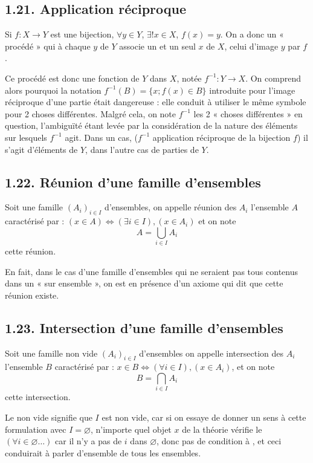 \subsection*{1.21. Application réciproque}

Si $f:X\to Y$ est une bijection, $\forall y\in Y$, $\exists!x\in X$, $f(x)=y$. On a donc un « procédé » qui à chaque $y$ de $Y$ associe un et un seul $x$ de $X$, celui d'image $y$ par $f$.

Ce procédé est donc une fonction de $Y$ dans $X$, notée $f^{-1}:Y\to X$. On comprend alors pourquoi la notation $f^{-1}(B)=\{x;f(x)\in B\}$ introduite pour l'image réciproque d'une partie était dangereuse : elle conduit à utiliser le même symbole pour 2 choses différentes. Malgré cela, on note $f^{-1}$ les 2 « choses différentes » en question, l'ambiguïté étant levée par la considération de la nature des éléments sur lesquels $f^{-1}$ agit. Dans un cas, ($f^{-1}$ application réciproque de la bijection $f$) il s'agit d'éléments de $Y$, dans l'autre cas de parties de $Y$.


\subsection*{1.22. Réunion d'une famille d'ensembles}

Soit une famille $(A_i)_{i\in I}$ d'ensembles, on appelle réunion des $A_i$ l'ensemble $A$ caractérisé par : $(x\in A)\Leftrightarrow(\exists i\in I),(x\in A_i)$ et on note
\[
A=\bigcup_{i\in I}A_i
\]
cette réunion.

En fait, dans le cas d'une famille d'ensembles qui ne seraient pas tous contenus dans un « sur ensemble », on est en présence d'un axiome qui dit que cette réunion existe.

\subsection*{1.23. Intersection d'une famille d'ensembles}

Soit une famille non vide $(A_i)_{i\in I}$ d'ensembles on appelle intersection des $A_i$ l'ensemble $B$ caractérisé par : $x\in B\Leftrightarrow(\forall i\in I),(x\in A_i)$, et on note
\[
B=\bigcap_{i\in I}A_i
\]
cette intersection.

Le non vide signifie que $I$ est non vide, car si on essaye de donner un sens à cette formulation avec $I=\varnothing$, n'importe quel objet $x$ de la théorie vérifie le $(\forall i\in\varnothing\ldots)$ car il n'y a pas de $i$ dans $\varnothing$, donc pas de condition à , et ceci conduirait à parler d'ensemble de tous les ensembles.

